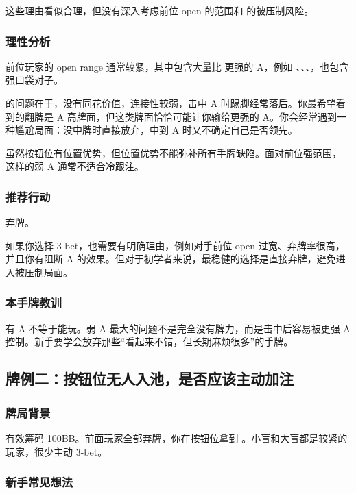 这些理由看似合理，但没有深入考虑前位 open 的范围和  的被压制风险。

\subsubsection*{理性分析}

前位玩家的 open range 通常较紧，其中包含大量比  更强的 A，例如 、、、，也包含强口袋对子。

 的问题在于，没有同花价值，连接性较弱，击中 A 时踢脚经常落后。你最希望看到的翻牌是 A 高牌面，但这类牌面恰恰可能让你输给更强的 A。你会经常遇到一种尴尬局面：没中牌时直接放弃，中到 A 时又不确定自己是否领先。

虽然按钮位有位置优势，但位置优势不能弥补所有手牌缺陷。面对前位强范围， 这样的弱 A 通常不适合冷跟注。

\subsubsection*{推荐行动}

弃牌。

如果你选择 3-bet，也需要有明确理由，例如对手前位 open 过宽、弃牌率很高，并且你有阻断 A 的效果。但对于初学者来说，最稳健的选择是直接弃牌，避免进入被压制局面。

\subsubsection*{本手牌教训}

有 A 不等于能玩。弱 A 最大的问题不是完全没有牌力，而是击中后容易被更强 A 控制。新手要学会放弃那些“看起来不错，但长期麻烦很多”的手牌。

\subsection{牌例二：按钮位无人入池，是否应该主动加注}

\subsubsection*{牌局背景}

有效筹码 100BB。前面玩家全部弃牌，你在按钮位拿到 。小盲和大盲都是较紧的玩家，很少主动 3-bet。

\subsubsection*{新手常见想法}

